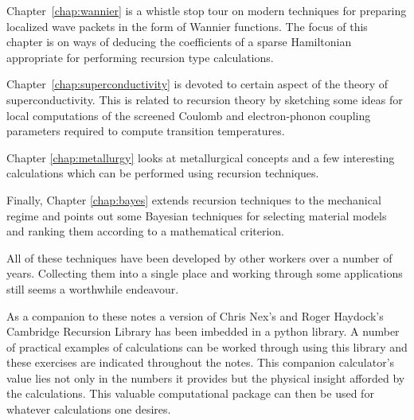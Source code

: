 Chapter~\ref{chap:wannier} is a whistle stop tour 
on modern techniques for preparing localized wave packets in the 
form of Wannier functions. The focus of this chapter is on 
ways of deducing the coefficients of a sparse Hamiltonian
appropriate for performing recursion type calculations.



Chapter~\ref{chap:superconductivity} is devoted to
certain aspect of the theory of superconductivity. 
This is related to recursion theory by sketching some ideas for 
local computations of the screened Coulomb and electron-phonon
coupling parameters required to compute transition temperatures.

Chapter \ref{chap:metallurgy} looks at metallurgical concepts 
and a few interesting calculations which can be performed 
using recursion techniques. 

Finally, Chapter \ref{chap:bayes} extends recursion techniques
to the mechanical regime and points out some Bayesian techniques 
for selecting material models and ranking them according 
to a mathematical criterion. 

All of these techniques have been developed by other workers 
over a number of years. Collecting them into a single place 
and working through some applications still seems a worthwhile 
endeavour. 

As a companion to these notes a version of Chris Nex's and 
Roger Haydock's Cambridge Recursion Library
has been imbedded in a python library. A number of practical examples 
of calculations can be worked through using this library and these 
exercises are indicated throughout the notes. 
This companion calculator's value lies not only
in the numbers it provides but the physical insight afforded by the 
calculations. This valuable computational package can then be used for 
whatever calculations one desires.

